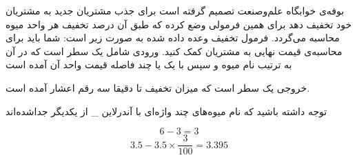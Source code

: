 \gdef\thisproblemauthor{\rl{امیرمحمد احساندار}}
\begin{problem}{}
{}{}
{}{}{}
بوفه‌ی خوابگاه علم‌وصنعت تصمیم گرفته است برای جذب مشتریان جدید به مشتریان خود تخفیف دهد برای همین فرمولی وضع کرده که طبق آن درصد تخفیف هر واحد میوه محاسبه می‌گردد. فرمول تخفیف وعده داده شده به صورت زیر است:
  شما باید برای محاسبه‌ی قیمت نهایی به مشتریان کمک کنید.
    \InputFile
ورودی شامل یک سطر است که در آن به ترتیب نام میوه و سپس با یک یا چند فاصله قیمت واحد آن آمده است

    \OutputFile

خروجی یک سطر است که میزان تخفیف تا دقیقا سه رقم اعشار آمده است.

\Explanations
توجه داشته باشید که نام میوه‌های چند واژه‌ای با آندرلاین
\colorbox{gray!10}{ \_ }
از یکدیگر جداشده‌اند
    \Examples

\Explanation

\begin{equation}
    6 - 3 = 3
\end{equation}
\begin{equation}
    3.5 - 3.5 \times \frac{3}{100} = 3.395
\end{equation}

%
%


\end{problem}
